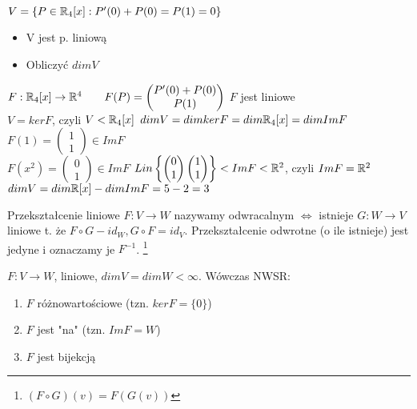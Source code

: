 \begin{prz}
    $ V = \{ P \in \mathbb{R}_4[x] : P'(0) + P(0) = P(1) = 0 \}$ 
    \begin{itemize}
        \item V jest p. liniową
        \item Obliczyć $dim V$
    \end{itemize}
    $ F : \mathbb{R}_4[x] \rightarrow \mathbb{R}^4 
        \qquad F(P) = \begin{pmatrix} P'(0) + P(0) \\ P(1) \end{pmatrix} $ \quad $F$ jest liniowe \\
    $V = ker F$, czyli $V < \mathbb{R}_4[x]$
    $dim V = dimker F = dim\mathbb{R}_4 [x] = dimImF$ %
    $F(1) = \begin{pmatrix} 1 \\ 1 \end{pmatrix} \in Im F$ \\
    $F(x^2) = \begin{pmatrix} 0 \\ 1 \end{pmatrix} \in Im F$
    $Lin \left\{ \begin{pmatrix} 0 \\ 1 \end{pmatrix} \begin{pmatrix} 1 \\ 1 \end{pmatrix} \right\} < Im F < \mathbb{R}^2 $, czyli
    $Im F = \mathbb{R}^2$ \\%
    $dimV = dim\mathbb{R}[x] - dimImF = 5 - 2 = 3$
\end{prz}

\begin{df} 
    Przekształcenie liniowe $F: V \rightarrow W $ nazywamy odwracalnym $\Leftrightarrow$ istnieje $G: W \rightarrow V$ liniowe t. że $F \circ G - id_W, G \circ F = id_V.$ Przekształcenie odwrotne (o ile istnieje) jest jedyne i oznaczamy je $F^{-1}$. \footnote{$(F \circ G)(v) = F(G(v))$}
\end{df}

\begin{ft} $F: V \rightarrow W $, liniowe, $dim V = dimW < \infty$. Wówczas NWSR:
    \begin{enumerate}[{(}1{)}]
        \item $F$ różnowartościowe (tzn. $kerF = \{0\}$)
        \item $F$ jest "na" (tzn. $Im F = W$)
        \item $F$ jest bijekcją
    \end{enumerate}
\end{ft}


